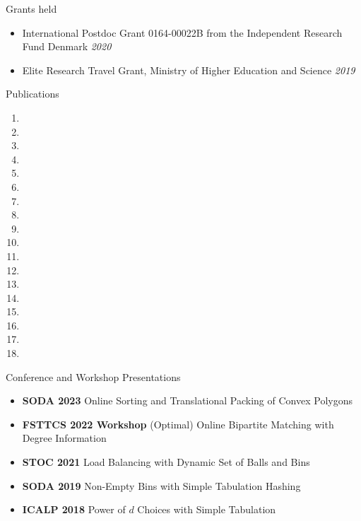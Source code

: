 \documentclass{resume} %
\begin{document}
\begin{rSection}{Grants held}
\begin{itemize}
\item International Postdoc Grant 
0164-00022B from the Independent Research Fund Denmark  \hfill{\emph{2020}} 
\item Elite Research Travel Grant, Ministry of Higher Education and Science  \hfill{\emph{2019}} 
\end{itemize}
\end{rSection}





\begin{rSection}{Publications}

\begin{enumerate}
	\item {}
	\item {}
	\item {}
	\item  {}
	\item {}
	\item {}
	\item  {}
	\item {}
	\item {}
	\item  {}
	\item {}
	\item   {}
	\item {}
	\item  {}
	\item {}
	\item {}
	\item {}
	\item {}
	\end{enumerate}
\end{rSection}


 
 
 
 \begin{rSection}{Conference and Workshop Presentations}
 \begin{itemize}
 \item  \textbf{SODA 2023}  Online Sorting and Translational Packing of Convex Polygons
 \item \textbf{FSTTCS 2022 Workshop}  (Optimal) Online Bipartite Matching with Degree Information
 \item \textbf{STOC 2021}  Load Balancing with Dynamic Set of Balls and Bins
 \item \textbf{SODA 2019} Non-Empty Bins with Simple Tabulation Hashing
 \item  \textbf{ICALP 2018}  Power of $d$ Choices with Simple Tabulation
 \end{itemize}
 \end{rSection}
 
\end{document}

